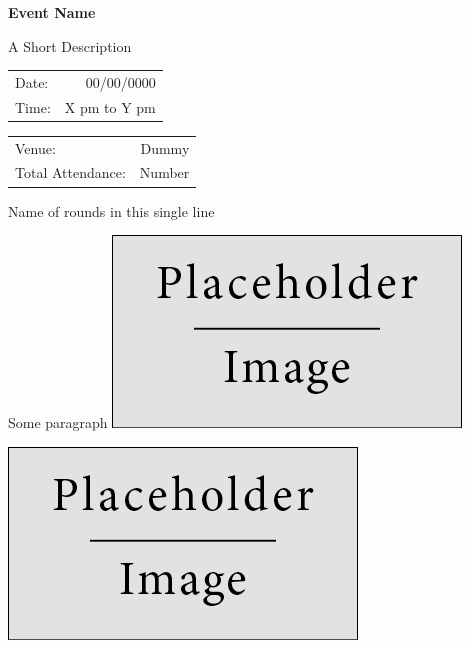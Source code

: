 \documentclass[12pt, a4 paper]{article}
\begin{document}
\begin{center}
\Huge \bfseries \ttfamily Event Name
\end{center}

\begin{center}
\large A Short Description
\end{center}

\begin{center}
\begin{multicols}{2}
\begin{tabular}{l r}
Date: & 00/00/0000\\ %
Time: & X pm to Y pm \\ %
\end{tabular}
\columnbreak
\begin{tabular}{l r}
Venue: & Dummy \\ %
Total Attendance: & Number \\ %
\end{tabular}
\end{multicols}


\begin{LARGE}
Name of rounds in this single line
\end{LARGE}

\begin{Large}
\begin{multicols}{2}
Some paragraph
\columnbreak
\includegraphics[width=\linewidth]{placeholder.jpg}
\end{multicols}

\begin{multicols}{2}

\includegraphics[width=\linewidth]{placeholder.jpg}


\end{multicols}
\end{Large}
\end{center}
\end{document}
